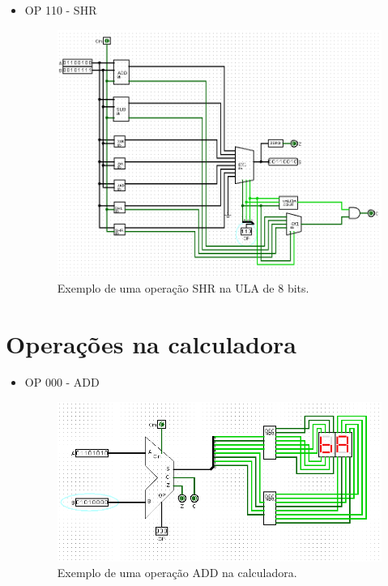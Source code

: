 \documentclass[
	12pt,				%
	openright,			%
	twoside,			%
	a4paper,			%
	english,			%
	french,				%
	spanish,			%
	brazil,				%
	]{abntex2}
\begin{document}
\begin{apendicesenv}
\begin{itemize}
\newpage
\item{OP 110 - SHR}

\begin{figure}[H]
	\begin{center}
	    \includegraphics[scale=0.5]{imagens/alu8110shr.png}
	\end{center}
\caption{\label{alu8110shr}Exemplo de uma operação SHR na ULA de 8 bits.}
\end{figure}

\end{itemize}


\newpage
\section{Operações na calculadora}

\begin{itemize}
\item {OP 000 - ADD}

\begin{figure}[H]
	\begin{center}
	    \includegraphics[scale=0.55]{imagens/calc000add.png}
	\end{center}
\caption{\label{calc000add}Exemplo de uma operação ADD na calculadora.}
\end{figure}


\end{itemize}
\end{apendicesenv}
\end{document}
